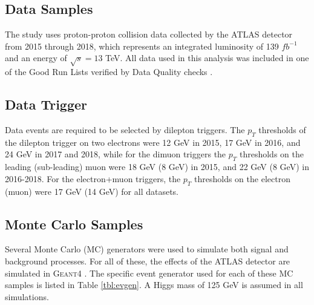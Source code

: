 
\subsection{Data Samples}

The study uses proton-proton collision data collected by the ATLAS detector from 2015 through 2018, which represents an integrated luminosity of 139 $fb^{-1}$ \cite{lumi} and an energy of $\sqrt{s} = 13$ TeV. All data used in this analysis was included in one of the Good Run Lists verified by Data Quality checks \cite{PERF-2010-01}.

\subsection{Data Trigger}
\label{sec:dataTrigger}

Data events are required to be selected by dilepton triggers. The $p_T$ thresholds of the dilepton trigger on two electrons were 12 GeV in 2015, 17 GeV in 2016, and 24 GeV in 2017 and 2018, while for the dimuon triggers the $p_T$ thresholds on the leading (sub-leading) muon were 18 GeV (8 GeV) in 2015, and 22 GeV (8 GeV) in 2016-2018. For the electron+muon triggers, the $p_T$ thresholds on the electron (muon) were 17 GeV (14 GeV) for all datasets.

\subsection{Monte Carlo Samples}
\label{sec:MCsamples}

Several Monte Carlo (MC) generators were used to simulate both signal and background processes. For all of these, the effects of the ATLAS detector are simulated in \textsc{Geant4} \cite{GEANT4}. The specific event generator used for each of these MC samples is listed in Table \ref{tbl:evgen}. A Higgs mass of 125 GeV is assumed in all simulations.

